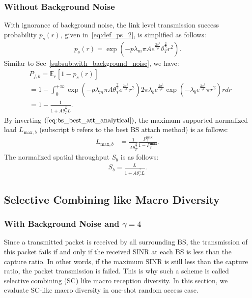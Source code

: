 \subsubsection{Without Background Noise}
With ignorance of background noise, the link level transmission success probability $p_{s}(r)$, given in~\eqref{eq:def_ps_2}, is simplified as follows:
\begin{align}
	\label{eq:succ_proba_with_modified_r}
	p_{s}(r) =\exp(-p \lambda_{m} \pi A e^{\frac{2\sigma^2}{\gamma^2}} \theta_{T}^{\frac{2}{\gamma}} r^2 ).
\end{align}
Similar to Sec~\ref{subsub:with_background_noise}, we have:
\begin{align}
\label{eq:bs_best_att_analytical}
&P_{f,b}= \mathbb{E}_{r}\left[ 1-p_{s}\left(r\right) \right]  \nonumber\\
&= 1 -\int_{0}^{+\infty}  \exp(-p \lambda_{m} \pi A \theta_{T}^{\frac{2}{\gamma}} e^{\frac{2\sigma^2}{\gamma^2}}  r^2 )  2 \pi \lambda_b e^{\frac{2\sigma^2}{\gamma^2}}  \exp( -\lambda_b  e^{\frac{2\sigma^2}{\gamma^2}} \pi r^2 ) r dr \nonumber\\
&= 1-\frac{1}{ 1 +  A \theta_{T}^{\frac{2}{\gamma}} L }.
\end{align}
By inverting $(\ref{eq:bs_best_att_analytical})$, the maximum supported normalized load $L_{\text{max}, b}$ (subscript $b$ refers to the best BS attach method) is as follows:
\begin{align}
	\label{eq:best_maximum_load}
	L_{\text{max},b} &=\frac{1}{A \theta_{T}^{\frac{2}{\gamma}}  } 
	\frac{P_{f}^{\text{max}}}{1 - P_{f}^{\textbf{max}}}. 
\end{align}
The normalized spatial throughput $S_{b}$ is as follows:
\begin{align}
	S_{b} =  \frac{L}{1 +  A  \theta_{T}^{\frac{2}{\gamma}} L }.
\end{align}



\subsection{Selective Combining like Macro Diversity}
\label{sec:sc_macro_diversity}
\subsubsection{With Background Noise and $\gamma=4$}
Since a transmitted packet is received by all surrounding BS, the transmission of this packet fails if and only if the received SINR at each BS is less than the capture ratio. In other words, if the maximum SINR is still less than the capture ratio, the packet transmission is failed. This is why such a scheme is called selective combining (SC) like macro reception diversity. In this section, we evaluate SC-like macro diversity in one-shot random access case.

